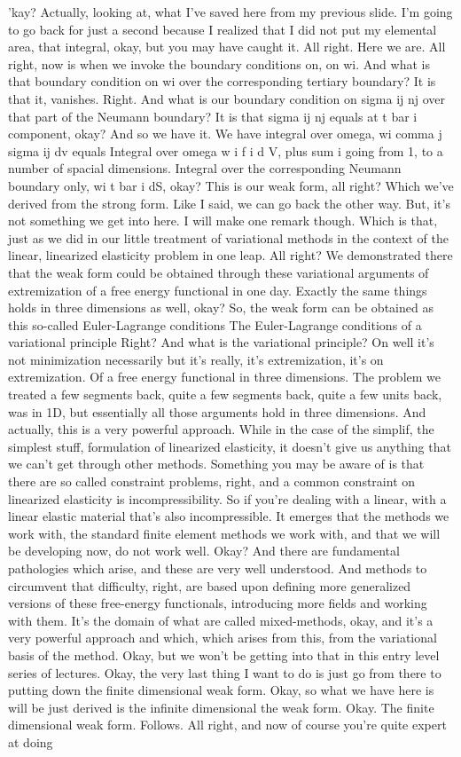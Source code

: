 \documentclass[10pt]{article}
\begin{document}
'kay? Actually, looking at, what I've saved here from my previous slide. I'm going to go back for just a second because I realized that I did not put my elemental area, that integral, okay, but you may have caught it. All right. Here we are. All right, now is when we invoke the boundary conditions on, on wi. And what is that boundary condition on wi over the corresponding tertiary boundary? It is that it, vanishes. Right. And what is our boundary condition on sigma ij nj over that part of the Neumann boundary? It is that sigma ij nj equals at t bar i component, okay? And so we have it. We have integral over omega, wi comma j sigma ij dv equals Integral over omega w i f i d V, plus sum i going from 1, to a number of spacial dimensions. Integral over the corresponding Neumann boundary only, wi t bar i dS, okay? This is our weak form, all right? Which we've derived from the strong form. Like I said, we can go back the other way. But, it's not something we get into here. I will make one remark though. Which is that, just as we did in our little treatment of variational methods in the context of the linear, linearized elasticity problem in one leap. All right? We demonstrated there that the weak form could be obtained through these variational arguments of extremization of a free energy functional in one day. Exactly the same things holds in three dimensions as well, okay? So, the weak form can be obtained as this so-called Euler-Lagrange conditions The Euler-Lagrange conditions of a variational principle Right? And what is the variational principle? On well it's not minimization necessarily but it's really, it's extremization, it's on extremization. Of a free energy functional in three dimensions. The problem we treated a few segments back, quite a few segments back, quite a few units back, was in 1D, but essentially all those arguments hold in three dimensions. And actually, this is a very powerful approach. While in the case of the simplif, the simplest stuff, formulation of linearized elasticity, it doesn't give us anything that we can't get through other methods. Something you may be aware of is that there are so called constraint problems, right, and a common constraint on linearized elasticity is incompressibility. So if you're dealing with a linear, with a linear elastic material that's also incompressible. It emerges that the methods we work with, the standard finite element methods we work with, and that we will be developing now, do not work well. Okay? And there are fundamental pathologies which arise, and these are very well understood. And methods to circumvent that difficulty, right, are based upon defining more generalized versions of these free-energy functionals, introducing more fields and working with them. It's the domain of what are called mixed-methods, okay, and it's a very powerful approach and which, which arises from this, from the variational basis of the method. Okay, but we won't be getting into that in this entry level series of lectures. Okay, the very last thing I want to do is just go from there to putting down the finite dimensional weak form. Okay, so what we have here is will be just derived is the infinite dimensional the weak form.  Okay. The finite dimensional weak form. Follows. All right, and now of course you're quite expert at doing 
\end{document}
